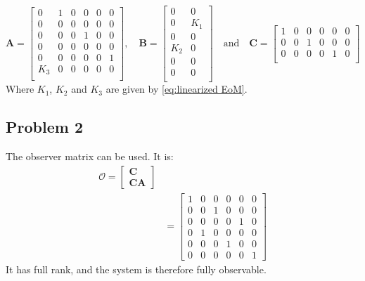 \begin{equation}
  \label{eq:state_space_A_B_C}
  \bm{A} =
  \begin{bmatrix}
    0 & 1 & 0 & 0 & 0 & 0 \\
    0 & 0 & 0 & 0 & 0 & 0 \\
    0 & 0 & 0 & 1 & 0 & 0 \\
    0 & 0 & 0 & 0 & 0 & 0 \\
    0 & 0 & 0 & 0 & 0 & 1 \\
    K_3 & 0 & 0 & 0 & 0 & 0 \\
  \end{bmatrix}
  , \quad \bm{B} =
  \begin{bmatrix}
    0 & 0 \\
    0 & K_1 \\
    0 & 0 \\
    K_2 & 0 \\
    0 & 0 \\
    0 & 0 \\
  \end{bmatrix}
  \quad \text{and} \quad \bm{C} =
  \begin{bmatrix}
    1 & 0 & 0 & 0 & 0 & 0 \\
    0 & 0 & 1 & 0 & 0 & 0 \\
    0 & 0 & 0 & 0 & 1 & 0 \\
  \end{bmatrix}
\end{equation}
%
Where $K_1$, $K_2$ and $K_3$ are given by \cref{eq:linearized EoM}.
%
\subsection{Problem 2}
The observer matrix can be used. It is:
\begin{align*}
	\bm{\mathcal{O}} = 
	\begin{bmatrix}
		\bm{C} \\
		\bm{CA}
	\end{bmatrix} \\
  &=\begin{bmatrix}
    1 & 0 & 0 & 0 & 0 & 0 \\
    0 & 0 & 1 & 0 & 0 & 0 \\
    0 & 0 & 0 & 0 & 1 & 0 \\
    0 & 1 & 0 & 0 & 0 & 0 \\
    0 & 0 & 0 & 1 & 0 & 0 \\
    0 & 0 & 0 & 0 & 0 & 1
	\end{bmatrix}
\end{align*}	
It has full rank, and the system is therefore fully observable.

